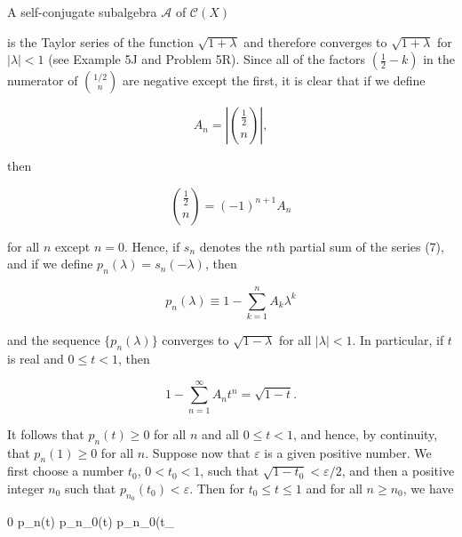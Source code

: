 A self-conjugate subalgebra $\mathcal{A}$ of $\mathcal{C}(X)$

is the Taylor series of the function $\sqrt{1 + \lambda}$ and therefore converges to $\sqrt{1 + \lambda}$ for $|\lambda| < 1$ (see Example 5J and Problem 5R). Since all of the factors $(\frac{1}{2} - k)$ in the numerator of $\binom{1/2}{n}$ are negative except the first, it is clear that if we define

$$A_n = \left| \binom{\frac{1}{2}}{n} \right|,$$

then

$$\binom{\frac{1}{2}}{n} = (-1)^{n+1} A_n$$

for all $n$ except $n = 0$. Hence, if $s_n$ denotes the $n$th partial sum of the series (7), and if we define $p_n(\lambda) = s_n(-\lambda)$, then

$$p_n(\lambda) \equiv 1 - \sum_{k=1}^{n} A_k \lambda^k$$

and the sequence $\{p_n(\lambda)\}$ converges to $\sqrt{1 - \lambda}$ for all $|\lambda| < 1$. In particular, if $t$ is real and $0 \leq t < 1$, then

$$1 - \sum_{n=1}^{\infty} A_n t^n = \sqrt{1 - t}.$$

It follows that $p_n(t) \geq 0$ for all $n$ and all $0 \leq t < 1$, and hence, by continuity, that $p_n(1) \geq 0$ for all $n$. Suppose now that $\varepsilon$ is a given positive number. We first choose a number $t_0$, $0 < t_0 < 1$, such that $\sqrt{1 - t_0} < \varepsilon/2$, and then a positive integer $n_0$ such that $p_{n_0}(t_0) < \varepsilon$. Then for $t_0 \leq t \leq 1$ and for all $n \geq n_0$, we have

$$0 \leq {} \leq p_n(t) \leq p_{n_0}(t) \leq p_{n_0}(t_

